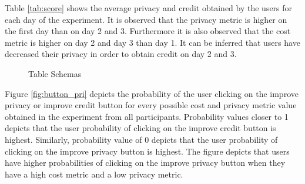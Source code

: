 Table \ref{tab:score} shows the average privacy and credit obtained by the users for each day of the experiment. It is observed that the privacy metric is higher on the first day than on day 2 and 3. Furthermore it is also observed that the cost metric is higher on day 2 and day 3 than day 1.
It can be inferred that users have decreased their privacy in order to obtain credit on day 2 and 3.

\begin{figure}[htp]
\hspace{1em}
\caption{Table Schemas}
\label{fig:st3}
\end{figure}

Figure \ref{fig:button_pri} depicts the probability of the user clicking on the improve privacy or improve credit button for every possible cost and privacy metric value obtained in the experiment from all participants. Probability values closer to 1 depicts that the user probability of clicking on the improve credit button is highest. Similarly, probability value of 0 depicts that the user probability of clicking on the improve privacy button is highest. The figure depicts that users have higher probabilities of clicking on the improve privacy button when they have a high cost metric and a low privacy metric.

